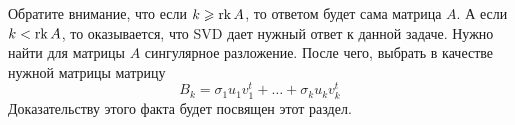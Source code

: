 Обратите внимание, что если $k \geqslant \operatorname{rk} A$, то ответом будет сама матрица $A$. А если $k < \operatorname{rk} A$, то оказывается, что SVD дает нужный ответ к данной задаче. Нужно найти для матрицы $A$ сингулярное разложение. После чего, выбрать в качестве нужной матрицы матрицу
\[
B_k = \sigma_1 u_1 v_1^t + \ldots + \sigma_k u_k v_k^t
\]
Доказательству этого факта будет посвящен этот раздел.